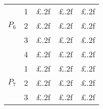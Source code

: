 \documentclass[11pt]{article}
\begin{document}
\begin{table}
\begin{tabular}{cc|c|c|c||}
\multicolumn{1}{|c|}{\multirow{3}{*}{$P_6$}} & 1 
 & \multicolumn{1}{||c|}{£.2f} & £.2f & £.2f \\ \cline{2-5} 
\multicolumn{1}{|c|}{} & 2
 & \multicolumn{1}{||c|}{£.2f} & £.2f & £.2f \\ \cline{2-5} 
\multicolumn{1}{|c|}{} & 3
 & \multicolumn{1}{||c|}{£.2f} & £.2f & £.2f \\ \cline{2-5} 
\multicolumn{1}{|c|}{} & 4
 & \multicolumn{1}{||c|}{£.2f} & £.2f & £.2f \\ \hline \hline

\multicolumn{1}{|c|}{\multirow{3}{*}{$P_7$}} & 1 
 & \multicolumn{1}{||c|}{£.2f} & £.2f & £.2f \\ \cline{2-5} 
\multicolumn{1}{|c|}{} & 2
 & \multicolumn{1}{||c|}{£.2f} & £.2f & £.2f \\ \cline{2-5} 
\multicolumn{1}{|c|}{} & 3
 & \multicolumn{1}{||c|}{£.2f} & £.2f & £.2f \\ \hline

\end{tabular}
\end{table}
\end{document}
